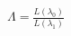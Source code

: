 \documentclass[preview]{standalone}
\begin{document}
\begin{align*}
\Lambda = \frac{L(\lambda_0)}{L(\lambda_1)}
\end{align*}
\end{document}

